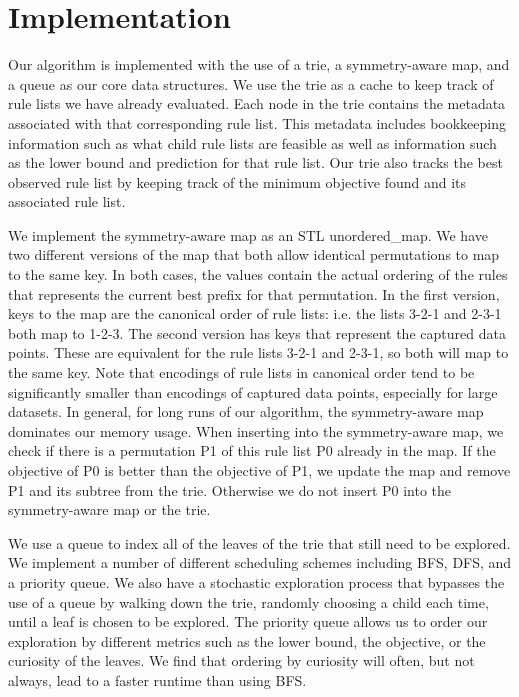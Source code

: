 \section{Implementation}
\label{sec:implementation}

Our algorithm is implemented with the use of a trie, a symmetry-aware map, and a queue as our core data structures. We use the trie as a cache to keep track of rule lists we have already evaluated. Each node in the trie contains the metadata associated with that corresponding rule list. This metadata includes bookkeeping information such as what child rule lists are feasible as well as information such as the lower bound and prediction for that rule list. Our trie also tracks the best observed rule list by keeping track of the minimum objective found and its associated rule list.

We implement the symmetry-aware map as an STL unordered\_map. We have two different versions of the map that both allow identical permutations to map to the same key. In both cases, the values contain the actual ordering of the rules that represents the current best prefix for that permutation. In the first version, keys to the map are the canonical order of rule lists: i.e. the lists 3-2-1 and 2-3-1 both map to 1-2-3. The second version has keys that represent the captured data points. These are equivalent for the rule lists 3-2-1 and 2-3-1, so both will map to the same key.
%
Note that encodings of rule lists in canonical order tend to be
significantly smaller than encodings of captured data points,
especially for large datasets.
%
In general, for long runs of our algorithm, the symmetry-aware map dominates our memory usage. When inserting into the symmetry-aware map, we check if there is a permutation P1 of this rule list P0 already in the map. If the objective of P0 is better than the objective of P1, we update the map and remove P1 and its subtree from the trie. Otherwise we do not insert P0 into the symmetry-aware map or the trie.

We use a queue to index all of the leaves of the trie that still need to be explored. We implement a number of different scheduling schemes including BFS, DFS, and a priority queue. We also have a stochastic exploration process that bypasses the use of a queue by walking down the trie, randomly choosing a child each time, until a leaf is chosen to be explored. The priority queue allows us to order our exploration by different metrics such as the lower bound, the objective, or the curiosity of the leaves. We find that ordering by curiosity will often, but not always, lead to a faster runtime than using BFS.


